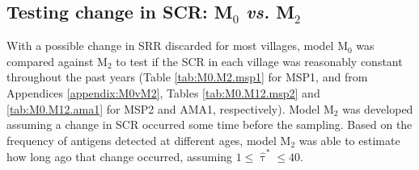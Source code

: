 \newpage


\subsection[Testing change in seroconversion rate]{Testing change in SCR: M$_{0}$ \textit{vs.} M$_{2}$}

With a possible change in SRR discarded for most villages, model M$_0$ was compared against M$_2$ to test if the SCR in each village was reasonably constant throughout the past years (Table \ref{tab:M0.M2.msp1} for MSP1, and from Appendices \ref{appendix:M0vM2}, Tables \ref{tab:M0.M12.msp2} and \ref{tab:M0.M12.ama1} for MSP2 and AMA1, respectively).
Model M$_2$ was developed assuming a change in SCR occurred some time before the sampling.
Based on the frequency of antigens detected at different ages, model M$_2$ was able to estimate how long ago that change occurred, assuming $1\leq \widehat{\uptau}^*\leq40$.

